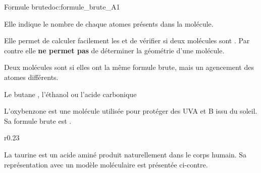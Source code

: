 %



\vspace*{-12pt}

\vspace*{-8pt}
\begin{doc}{Formule brute}{doc:formule_brute_A1}
  \begin{importants}
    Elle indique le nombre de chaque atomes présents dans la molécule.
  \end{importants}
  Elle permet de calculer facilement les  et de vérifier si deux molécules sont .
  Par contre elle \textbf{ne permet pas} de déterminer la géométrie d'une molécule.

  \begin{importants}
    Deux molécules sont  si elles ont la même formule brute, mais un agencement des atomes différents.
  \end{importants}

  \exemple Le butane , l'éthanol  ou l'acide carbonique 
\end{doc}

L'oxybenzone est une molécule utilisée pour protéger des UVA et B issu du soleil.
Sa formule brute est .


\vspace*{8pt}
\begin{wrapfigure}[2]{r}{0.23\linewidth}
  \vspace*{-22pt}
\end{wrapfigure}

La taurine est un acide aminé produit naturellement dans le corps humain.
Sa représentation avec un modèle moléculaire est présentée ci-contre.


